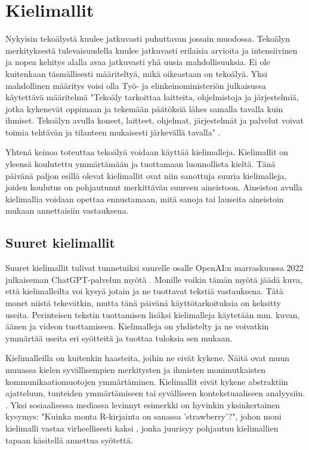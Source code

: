 \chapter{Kielimallit}
\label{ch:kielimallit}

Nykyisin tekoälystä kuulee jatkuvasti puhuttavan jossain muodossa. Tekoälyn
merkityksestä tulevaisuudella kuulee jatkuvasti erilaisia arvioita ja
intensiivinen ja nopea kehitys alalla avaa jatkuvasti yhä uusia
mahdollisuuksia. Ei ole kuitenkaan täsmällisesti määriteltyä, mikä oikeastaan
on tekoälyä. Yksi mahdollinen määritys voisi olla Työ- ja elinkeinoministeriön
julkaisussa käytettävä määritelmä "Tekoäly tarkoittaa laitteita, ohjelmistoja
ja järjestelmiä, jotka kykenevät oppimaan ja tekemään päätöksiä lähes samalla
tavalla kuin ihmiset. Tekoälyn avulla koneet, laitteet, ohjelmat, järjestelmät
ja palvelut voivat toimia tehtävän ja tilanteen mukaisesti järkevällä tavalla"
\parencite{valtioneuvostoSuomenTekoalyaika}.

Yhtenä keinoa toteuttaa tekoälyä voidaan käyttää kielimalleja. Kielimallit on
yleensä koulutettu ymmärtämään ja tuottamaan luonnollista kieltä. Tänä päivänä
paljon esillä olevat kielimallit ovat niin sanottuja suuria kielimalleja,
joiden koulutus on pohjautunut merkittävän suureen aineistoon. Aineiston avulla
kielimallia voidaan opettaa ennustamaan, mitä sanoja tai lauseita aineistoin
mukaan annettaisiin vastauksena.

\section{Suuret kielimallit}

Suuret kielimallit tulivat tunnetuiksi suurelle osalle OpenAI:n marraskuussa
2022 julkaiseman ChatGPT-palvelun myötä \parencite{alma9911564814005973}.
Monille voikin tämän myötä jäädä kuva, että kielimalleilta voi kysyä jotain ja
ne tuottavat tekstiä vastauksena. Tätä monet niistä tekevätkin, mutta tänä
päivänä käyttötarkoituksia on keksitty useita. Perinteisen tekstin tuottamisen
lisäksi kielimalleja käytetään mm. kuvan, äänen ja videon tuottamiseen.
Kielimalleja on yhdistelty ja ne voivatkin ymmärtää useita eri syötteitä ja
tuottaa tuloksia sen mukaan.

Kielimalleilla on kuitenkin haasteita, joihin ne eivät kykene. Näitä ovat muun
muuassa kielen syvällisempien merkitysten ja ihmisten monimutkaisten
kommunikaatiomuotojen ymmärtäminen. Kielimallit eivät kykene abstraktiin
ajatteluun, tunteiden ymmärtämiseen tai syvälliseen kontekstuaaliseen
analyysiin. \parencite{haukkaJimiKuinkakielimallitOppivat}. Yksi sosiaalisessa
mediassa levinnyt esimerkki on hyvinkin yksinkertainen kysymys: "Kuinka monta
R-kirjainta on sanassa 'strawberry'?", johon moni kielimalli vastaa
virheellisesti kaksi \parencite{alberttechStrawberry}, jonka juurisyy pohjautuu
kielimallien tapaan käsitellä annettua syötettä.

